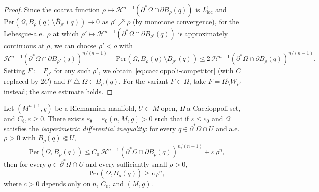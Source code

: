 \begin{proof}
Since the coarea function $\rho \mapsto \mathcal{H}^{n-1}(\partial^*\Omega \cap \partial B_\rho(q))$ is $L^1_{\mathrm{loc}}$ and $\mathrm{Per}(\Omega, B_\rho(q) \setminus \overline{B}_{\rho'}(q)) \to 0$ as $\rho' \nearrow \rho$ (by monotone convergence), for the Lebesgue-a.e.\ $\rho$ at which $\rho' \mapsto \mathcal{H}^{n-1}(\partial^*\Omega \cap \partial B_{\rho'}(q))$ is approximately continuous at $\rho$, we can choose $\rho' < \rho$ with
\begin{equation}\label{eq:Frho-prime-slice-bound}
    \mathcal{H}^{n-1}(\partial^*\Omega \cap \partial B_{\rho'}(q))^{n/(n-1)} + \mathrm{Per}(\Omega, B_\rho(q) \setminus \overline{B}_{\rho'}(q)) \leq 2\,\mathcal{H}^{n-1}(\partial^*\Omega \cap \partial B_{\rho}(q))^{n/(n-1)}.
\end{equation}
Setting $F := F_{\rho'}$ for any such $\rho'$, we obtain~\eqref{eq:caccioppoli-competitor} (with $C$ replaced by $2C$) and $F \mathbin{\triangle} \Omega \Subset B_\rho(q)$.
For the variant $F \subset \Omega$, take $F = \Omega \setminus W_{\rho'}$ instead; the same estimate holds.
\end{proof}

\begin{proposition}\label{prop:mass-ratio-lower-bound}
Let $(M^{n+1}, g)$ be a Riemannian manifold, $U \subset M$ open, $\Omega$ a Caccioppoli set, and $C_0, \varepsilon \geq 0$.
There exists $\varepsilon_0 = \varepsilon_0(n, M, g) > 0$ such that if $\varepsilon \leq \varepsilon_0$ and $\Omega$ satisfies the \emph{isoperimetric differential inequality}: for every $q \in \partial^*\Omega \cap U$ and a.e.\ $\rho > 0$ with $B_\rho(q) \Subset U$,
\begin{equation}\label{eq:isoperimetric-ode}
    \mathrm{Per}(\Omega, B_\rho(q)) \leq C_0\,\mathcal{H}^{n-1}(\partial^*\Omega \cap \partial B_\rho(q))^{n/(n-1)} + \varepsilon\,\rho^n,
\end{equation}
then for every $q \in \partial^*\Omega \cap U$ and every sufficiently small $\rho > 0$,
\begin{equation}\label{eq:mass-ratio-lower-bound}
    \mathrm{Per}(\Omega, B_\rho(q)) \geq c\,\rho^n,
\end{equation}
where $c > 0$ depends only on $n$, $C_0$, and $(M,g)$.
\end{proposition}

